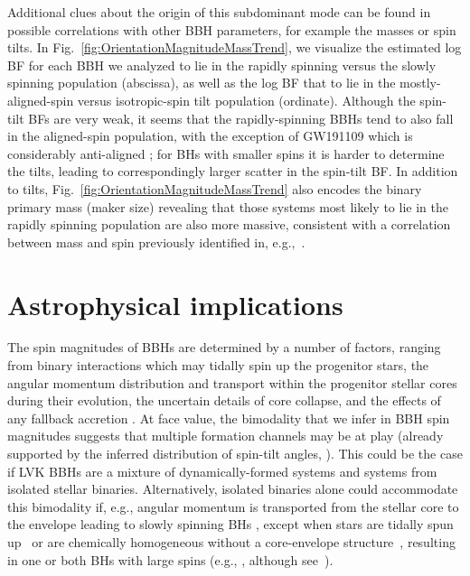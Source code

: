 \documentclass[twocolumn,usenames,dvipsnames,linenumbers]{aastex631}
\begin{document}
Additional clues about the origin of this subdominant mode can be found in possible correlations with other \ac{BBH} parameters, for example the masses or spin tilts.
In Fig.~\ref{fig:OrientationMagnitudeMassTrend}, we visualize the estimated log \ac{BF} for each \ac{BBH} we analyzed to lie in the rapidly spinning versus the slowly spinning population (abscissa), as well as the log \ac{BF} that to lie in the mostly-aligned-spin versus isotropic-spin tilt population (ordinate).
Although the spin-tilt \acp{BF} are very weak, it seems that the rapidly-spinning \acp{BBH} tend to also fall in the aligned-spin population, with the exception of GW191109 which is considerably anti-aligned \citep{Udall:2024ovp};
for \acp{BH} with smaller spins it is harder to determine the tilts, leading to correspondingly larger scatter in the spin-tilt \ac{BF}.
In addition to tilts, Fig.~\ref{fig:OrientationMagnitudeMassTrend} also encodes the binary primary mass (maker size) revealing that those systems most likely to lie in the rapidly spinning population are also more massive, consistent with a correlation between mass and spin previously identified in, e.g.,~\cite{Tiwari:2020otp,2022ApJ...928...75H,Franciolini:2022iaa, Callister:2021fpo, Adamcewicz:2022hce, Biscoveanu:2022qac}.


\section{Astrophysical implications}
\label{sec:Implications}

The spin magnitudes of \acp{BBH} are determined by a number of factors, ranging from binary interactions which may tidally spin up the progenitor stars, the angular momentum distribution and transport within the progenitor stellar cores during their evolution, the uncertain details of core collapse, and the effects of any fallback accretion \citep[e.g.,][and references therein]{Mandel:2018hfr}.
At face value, the bimodality that we infer in \ac{BBH} spin magnitudes suggests that multiple formation channels may be at play (already supported by the inferred distribution of spin-tilt angles, \citealt{KAGRA:2021duu}).
This could be the case if \ac{LVK} \acp{BBH} are a mixture of dynamically-formed systems and systems from isolated stellar binaries.
Alternatively, isolated binaries alone could accommodate this bimodality if, e.g., angular momentum is transported from the stellar core to the envelope leading to slowly spinning \acp{BH} \citep{Fuller:2019sxi}, except when stars are tidally spun up~\citep[e.g.][]{Kushnir:2016zee,Fuller:2022ysb,Ma:2023nrf} or are chemically homogeneous without a core-envelope structure~\citep[e.g.][]{Mandel:2015qlu,deMink:2016vkw,Marchant:2016wow}, resulting in one or both \acp{BH} with large spins (e.g., \citealt{Qin:2018sxk}, although see~\citealt{Riley:2020btf}).
\end{document}
